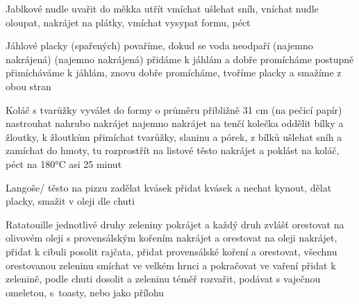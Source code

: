 \documentclass[12pt,a4paper]{article}
\begin{document}
\begin{recipe}{Jablkové nudle}
   uvařit do měkka
   utřít
   vmíchat
   ušlehat sníh, vníchat nudle
   oloupat, nakrájet na plátky, vmí\-chat
   vysypat formu, péct
\end{recipe}
\newpage

\begin{recipe}{Jáhlové placky}
   (spařených)
   povaříme, dokud se voda neodpaří
   (najemno nakrájená)
   (najemno nakrájená)
   přidáme k jáhlám a dobře promícháme
   postupně přimícháváme k jáhlám, znovu dobře promícháme, tvoříme placky a smažíme z obou stran
\end{recipe}
\newpage

\begin{recipe}{Koláč s tvarůžky}
   vyválet do formy o průměru přibližně 31 cm (na pečicí papír)
   nastrouhat nahrubo
   nakrájet najemno
   nakrájet na tenčí kolečka
   oddělit bílky a žloutky, k žloutkům přimíchat tvarůžky, slaninu a pórek, z bílků ušlehat sníh a zamíchat do hmoty, tu rozprostřít na listové těsto
   nakrájet a poklást na koláč, péct na 180°C asi 25 minut
\end{recipe}
\newpage

\begin{recipe}{Langoše/ těsto na pizzu}
   zadělat kvásek
   přidat kvásek a nechat kynout, dělat placky, smažit v oleji
   dle chuti
\end{recipe}
\newpage

\begin{recipe}{Ratatouille}
   jednotlivé druhy zeleniny pokrájet a každý druh zvlášť orestovat na olivovém oleji s provensálským kořením
   nakrájet a orestovat na oleji
   nakrájet, přidat k cibuli
   posolit rajčata, přidat provensálské koření a orestovat, všechnu orestovanou zeleninu smíchat ve velkém hrnci a pokračovat ve vaření
   přidat k zelenině, podle chuti dosolit a zeleninu téměř rozvařit, podávat s vaječnou omeletou, s~toasty, nebo jako přílohu
\end{recipe}
\newpage
\end{document}
